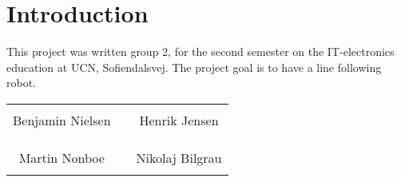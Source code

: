 \chapter*{Introduction}


This project was written group 2, for the second semester on the IT-electronics education at UCN, Sofiendalsvej. The project goal is to have a line following robot. 

%
\phantom{Luft}\vspace{3cm}
\begin{table}[H]
	\centering
		\begin{tabular}{c c c}
			\underline{\phantom{JAERJAERJAERJAERGO}} & \phantom{cookies} & \underline{\phantom{JAERJAERJAERJAERGO}} \\
			Benjamin Nielsen			& \phantom{cookies} & Henrik Jensen		\\
			&&\\
			&&\\
			\underline{\phantom{JAERJAERJAERJAERGO}} & \phantom{cookies} & \underline{\phantom{JAERJAERJAERJAERGO}} \\
			Martin Nonboe			& \phantom{cookies} & Nikolaj Bilgrau		\\
			&&\\
						
		\end{tabular}
\end{table}